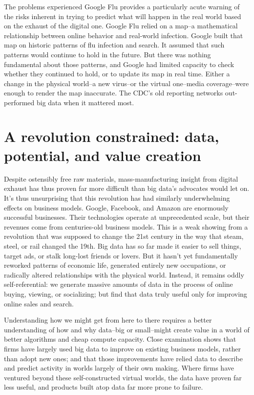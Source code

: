 \documentclass[12pt]{article}
\begin{document}
The problems experienced Google Flu provides a particularly acute
warning of the risks inherent in trying to predict what will happen in
the real world based on the exhaust of the digital one. Google Flu
relied on a map--a mathematical relationship between online behavior
and real-world infection. Google built that map on historic patterns
of flu infection and search. It assumed that such patterns would
continue to hold in the future. But there was nothing fundamental
about those patterns, and Google had limited capacity to check whether
they continued to hold, or to update its map in real time. Either a change in
the physical world--a new virus--or the virtual one--media
coverage--were enough to render the map inaccurate. The CDC's old
reporting networks out-performed big data when it mattered most.



\section{A revolution constrained: data, potential, and value creation}
\label{sec:but-what-can}

Despite ostensibly free raw materials, mass-manufacturing insight from
digital exhaust has thus proven far more difficult than big data's
advocates would let on. It's thus unsurprising that this revolution
has had similarly underwhelming effects on business models. Google,
Facebook, and Amazon are enormously successful businesses. Their
technologies operate at unprecedented scale, but their revenues come
from centuries-old business models. This is a weak showing from a
revolution that was supposed to change the 21st century in the way
that steam, steel, or rail changed the 19th. Big data has so far made
it easier to sell things, target ads, or stalk long-lost friends or
lovers. But it hasn't yet fundamentally reworked patterns of economic
life, generated entirely new occupations, or radically altered
relationships with the physical world. Instead, it remains oddly
self-referential: we generate massive amounts of data in the process
of online buying, viewing, or socializing; but find that data
truly useful only for improving online sales and search.

Understanding how we might get from here to there requires a better
understanding of how and why data--big or small--might create value in
a world of better algorithms and cheap compute capacity. Close
examination shows that firms have largely used big data to improve on
existing business models, rather than adopt new ones; and that those
improvements have relied data to describe and predict activity in
worlds largely of their own making. Where firms have ventured beyond
these self-constructed virtual worlds, the data have proven far less
useful, and products built atop data far more prone to failure. 
\end{document}

